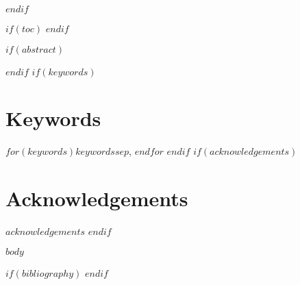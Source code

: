 \documentclass[UTF8]{ctexart}
\begin{document}
\cleardoublepage %
$endif$

$if(toc)$
\tableofcontents
\newpage %
$endif$

$if(abstract)$
\begin{abstract}
  $abstract$
\end{abstract}
$endif$
$if(keywords)$
\section*{Keywords} %
\noindent $for(keywords)$$keywords$$sep$, $endfor$
$endif$
$if(acknowledgements)$
    \section*{Acknowledgements} %
  $acknowledgements$
    \vspace{1em} %
  $endif$

  $body$ %


  $if(bibliography)$
    \newpage %
    \printbibliography
  $endif$
\end{document}
